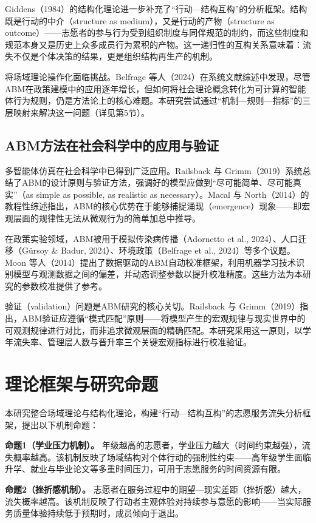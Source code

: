 \documentclass[12pt,a4paper]{article}
\begin{document}
Giddens（1984）的结构化理论进一步补充了“行动—结构互构”的分析框架。结构既是行动的中介（structure as medium），又是行动的产物（structure as outcome）——志愿者的参与行为受到组织制度与同伴规范的制约，而这些制度和规范本身又是历史上众多成员行为累积的产物。这一递归性的互构关系意味着：流失不仅是个体决策的结果，更是组织结构再生产的机制。

将场域理论操作化面临挑战。Belfrage 等人（2024）在系统文献综述中发现，尽管ABM在政策建模中的应用逐年增长，但如何将社会理论概念转化为可计算的智能体行为规则，仍是方法论上的核心难题。本研究尝试通过“机制—规则—指标”的三层映射来解决这一问题（详见第5节）。

\subsection{ABM方法在社会科学中的应用与验证}

多智能体仿真在社会科学中已得到广泛应用。Railsback 与 Grimm（2019）系统总结了ABM的设计原则与验证方法，强调好的模型应做到“尽可能简单、尽可能真实”（as simple as possible, as realistic as necessary）。Macal 与 North（2014）的教程性综述指出，ABM的核心优势在于能够捕捉涌现（emergence）现象——即宏观层面的规律性无法从微观行为的简单加总中推导。

在政策实验领域，ABM被用于模拟传染病传播（Adornetto et al., 2024）、人口迁移（Gürsoy \& Badur, 2024）、环境政策（Belfrage et al., 2024）等多个议题。Moon 等人（2014）提出了数据驱动的ABM自动校准框架，利用机器学习技术识别模型与观测数据之间的偏差，并动态调整参数以提升校准精度。这些方法为本研究的参数校准提供了参考。

验证（validation）问题是ABM研究的核心关切。Railsback 与 Grimm（2019）指出，ABM验证应遵循“模式匹配”原则——将模型产生的宏观规律与现实世界中的可观测规律进行对比，而非追求微观层面的精确匹配。本研究采用这一原则，以学年流失率、管理层人数与晋升率三个关键宏观指标进行校准验证。

\section{理论框架与研究命题}

本研究整合场域理论与结构化理论，构建“行动—结构互构”的志愿服务流失分析框架，提出以下机制命题：

\textbf{命题1（学业压力机制）。} 年级越高的志愿者，学业压力越大（时间约束越强），流失概率越高。该机制反映了场域结构对个体行动的强制性约束——高年级学生面临升学、就业与毕业论文等多重时间压力，可用于志愿服务的时间资源有限。

\textbf{命题2（挫折感机制）。} 志愿者在服务过程中的期望—现实差距（挫折感）越大，流失概率越高。该机制反映了行动者主观体验对持续参与意愿的影响——当实际服务质量体验持续低于预期时，成员倾向于退出。
\end{document}

